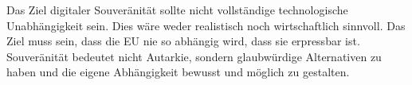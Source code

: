 Das Ziel digitaler Souveränität sollte nicht vollständige technologische Unabhängigkeit sein. Dies wäre weder realistisch noch 
wirtschaftlich sinnvoll. Das Ziel muss sein, dass die \ac{EU} nie so abhängig wird, dass sie erpressbar ist. Souveränität bedeutet nicht Autarkie, sondern glaubwürdige Alternativen zu haben und die eigene Abhängigkeit bewusst und möglich zu gestalten. 